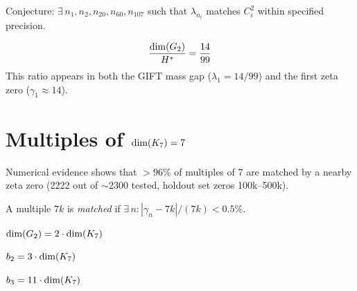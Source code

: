 \begin{definition}\label{def:spectral_hyp}
    \leanok
    Conjecture: $\exists\, n_1, n_2, n_{20}, n_{60}, n_{107}$ such that
    $\lambda_{n_i}$ matches $C_i^2$ within specified precision.
\end{definition}

\begin{theorem}\label{thm:unified_ratio}
    \leanok
    \[
        \frac{\mathrm{dim}(G_2)}{H^*} = \frac{14}{99}
    \]
    This ratio appears in both the GIFT mass gap ($\lambda_1 = 14/99$) and the
    first zeta zero ($\gamma_1 \approx 14$).
\end{theorem}

\section{Multiples of \texorpdfstring{$\mathrm{dim}(K_7) = 7$}{dim(K7) = 7}}

Numerical evidence shows that $> 96\%$ of multiples of 7 are matched by
a nearby zeta zero (2222 out of $\sim$2300 tested, holdout set zeros 100k--500k).

\begin{definition}\label{def:is_matched}
    A multiple $7k$ is \emph{matched} if $\exists\, n : |\gamma_n - 7k| / (7k) < 0.5\%$.
\end{definition}

\begin{theorem}[$\opdim(\Gtwo) = 2 \times 7$]\label{thm:dimG2_7}
    \leanok
    $\mathrm{dim}(G_2) = 2 \cdot \mathrm{dim}(K_7)$
\end{theorem}

\begin{theorem}[$\btwo = 3 \times 7$]\label{thm:b2_7}
    \leanok
    $b_2 = 3 \cdot \mathrm{dim}(K_7)$
\end{theorem}

\begin{theorem}[$\bthree = 11 \times 7$]\label{thm:b3_7}
    \leanok
    $b_3 = 11 \cdot \mathrm{dim}(K_7)$
\end{theorem}

